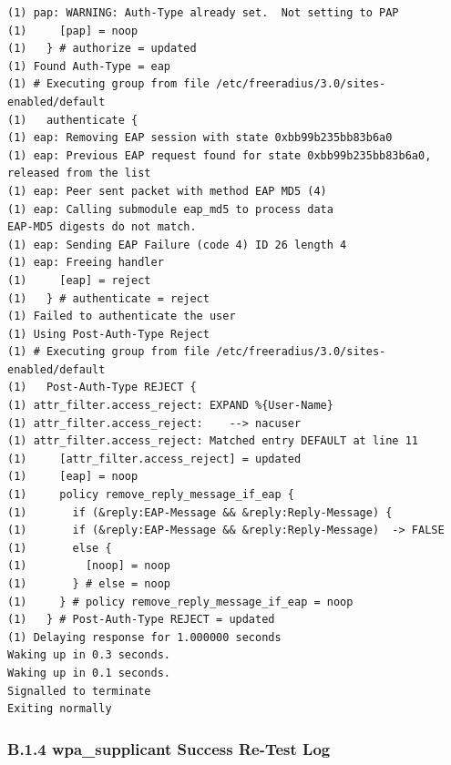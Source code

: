 \documentclass[11pt]{article}
\begin{document}
\begin{verbatim}
(1) pap: WARNING: Auth-Type already set.  Not setting to PAP
(1)     [pap] = noop
(1)   } # authorize = updated
(1) Found Auth-Type = eap
(1) # Executing group from file /etc/freeradius/3.0/sites-enabled/default
(1)   authenticate {
(1) eap: Removing EAP session with state 0xbb99b235bb83b6a0
(1) eap: Previous EAP request found for state 0xbb99b235bb83b6a0, released from the list
(1) eap: Peer sent packet with method EAP MD5 (4)
(1) eap: Calling submodule eap_md5 to process data
EAP-MD5 digests do not match.
(1) eap: Sending EAP Failure (code 4) ID 26 length 4
(1) eap: Freeing handler
(1)     [eap] = reject
(1)   } # authenticate = reject
(1) Failed to authenticate the user
(1) Using Post-Auth-Type Reject
(1) # Executing group from file /etc/freeradius/3.0/sites-enabled/default
(1)   Post-Auth-Type REJECT {
(1) attr_filter.access_reject: EXPAND %{User-Name}
(1) attr_filter.access_reject:    --> nacuser
(1) attr_filter.access_reject: Matched entry DEFAULT at line 11
(1)     [attr_filter.access_reject] = updated
(1)     [eap] = noop
(1)     policy remove_reply_message_if_eap {
(1)       if (&reply:EAP-Message && &reply:Reply-Message) {
(1)       if (&reply:EAP-Message && &reply:Reply-Message)  -> FALSE
(1)       else {
(1)         [noop] = noop
(1)       } # else = noop
(1)     } # policy remove_reply_message_if_eap = noop
(1)   } # Post-Auth-Type REJECT = updated
(1) Delaying response for 1.000000 seconds
Waking up in 0.3 seconds.
Waking up in 0.1 seconds.
Signalled to terminate
Exiting normally
\end{verbatim}


\subsubsection{B.1.4 wpa\_supplicant Success Re-Test Log}
\label{sec:appendix-b-wpa-supplicant-success-retest-log}
\end{document}
